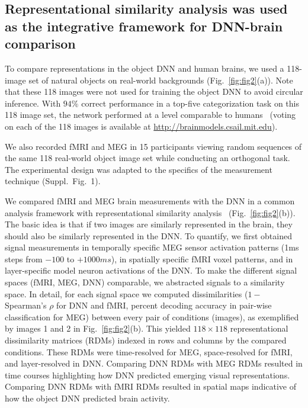 \documentclass[10pt,twocolumn,letterpaper]{article}
\begin{document}
\subsection{Representational similarity analysis was used as the integrative framework for DNN-brain comparison}
To compare representations in the object DNN and human brains, we used a 118-image set of natural objects on real-world backgrounds (Fig.~\ref{fig:fig2}(a)). Note that these 118 images were not used for training the object DNN to avoid circular inference. With $94\%$ correct performance in a top-five categorization task on this 118 image set, the network performed at a level comparable to humans~\cite{russakovsky2014imagenet} (voting on each of the 118 images is available at \href{http://brainmodels.csail.mit.edu}{http://brainmodels.csail.mit.edu}).

We also recorded fMRI and MEG in 15 participants viewing random sequences of the same 118 real-world object image set while conducting an orthogonal task. The experimental design was adapted to the specifics of the measurement technique (Suppl.~Fig.~1).

We compared fMRI and MEG brain measurements with the DNN in a common analysis framework with representational similarity analysis~\cite{kriegeskorte2008representational} (Fig.~\ref{fig:fig2}(b)). The basic idea is that if two images are similarly represented in the brain, they should also be similarly represented in the DNN. To quantify, we first obtained signal measurements in temporally specific MEG sensor activation patterns (1ms steps from $-100$ to $+1000ms$), in spatially specific fMRI voxel patterns, and in layer-specific model neuron activations of the DNN. To make the different signal spaces (fMRI, MEG, DNN) comparable, we abstracted signals to a similarity space. In detail, for each signal space we computed dissimilarities ($1-$Spearman's $\rho$ for DNN and fMRI, percent decoding accuracy in pair-wise classification for MEG) between every pair of conditions (images), as exemplified by images 1 and 2 in Fig.~\ref{fig:fig2}(b).  This yielded $118 \times 118$ representational dissimilarity matrices (RDMs) indexed in rows and columns by the compared conditions. These RDMs were time-resolved for MEG, space-resolved for fMRI, and layer-resolved in DNN. Comparing DNN RDMs with MEG RDMs resulted in time courses highlighting how DNN predicted emerging visual representations. Comparing DNN RDMs with fMRI RDMs resulted in spatial maps indicative of how the object DNN predicted brain activity.
\end{document}
